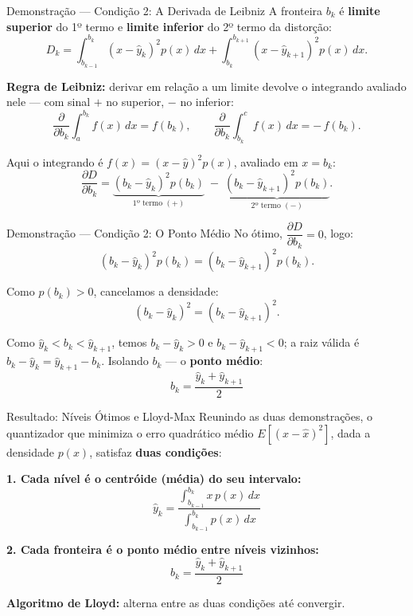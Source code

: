 
\begin{frame}{Demonstração — Condição 2: A Derivada de Leibniz}
  A fronteira $b_k$ é \textbf{limite superior} do 1º termo e
  \textbf{limite inferior} do 2º termo da distorção:
  \[
    D_k = \int_{b_{k-1}}^{b_k}\!\!\left(x-\hat{y}_k\right)^2 p(x)\,dx
        + \int_{b_k}^{b_{k+1}}\!\!\left(x-\hat{y}_{k+1}\right)^2 p(x)\,dx.
  \]

  \textbf{Regra de Leibniz:} derivar em relação a um limite devolve o
  integrando avaliado nele — com sinal $+$ no superior, $-$ no inferior:
  \[
    \frac{\partial}{\partial b_k}\!\int_{a}^{b_k}\! f(x)\,dx = f(b_k),
    \qquad
    \frac{\partial}{\partial b_k}\!\int_{b_k}^{c}\! f(x)\,dx = -\,f(b_k).
  \]

  Aqui o integrando é $f(x) = (x-\hat{y})^2 p(x)$, avaliado em $x=b_k$:
  \[
    \frac{\partial D}{\partial b_k}
    = \underbrace{\left(b_k-\hat{y}_k\right)^2 p(b_k)}_{\text{1º termo }(+)}
    \;-\;
    \underbrace{\left(b_k-\hat{y}_{k+1}\right)^2 p(b_k)}_{\text{2º termo }(-)}.
  \]
\end{frame}


\begin{frame}{Demonstração — Condição 2: O Ponto Médio}
  No ótimo, $\dfrac{\partial D}{\partial b_k} = 0$, logo:
  \[
    \left(b_k-\hat{y}_k\right)^2 p(b_k)
    = \left(b_k-\hat{y}_{k+1}\right)^2 p(b_k).
  \]

  Como $p(b_k) > 0$, cancelamos a densidade:
  \[
    \left(b_k-\hat{y}_k\right)^2 = \left(b_k-\hat{y}_{k+1}\right)^2.
  \]

  Como $\hat{y}_k < b_k < \hat{y}_{k+1}$, temos $b_k-\hat{y}_k > 0$ e
  $b_k-\hat{y}_{k+1} < 0$; a raiz válida é
  $b_k-\hat{y}_k = \hat{y}_{k+1}-b_k$. Isolando $b_k$ — o
  \textbf{ponto médio}:
  \[
    \boxed{\;b_k = \frac{\hat{y}_k + \hat{y}_{k+1}}{2}\;}
  \]
\end{frame}


\begin{frame}{Resultado: Níveis Ótimos e Lloyd-Max}
  Reunindo as duas demonstrações, o quantizador que minimiza o erro
  quadrático médio $E\!\left[(x-\hat{x})^2\right]$, dada a densidade
  $p(x)$, satisfaz \textbf{duas condições}:

  \vspace{0.15cm}
  \textbf{1. Cada nível é o centróide (média) do seu intervalo:}
  \[
    \hat{y}_k = \frac{\displaystyle\int_{b_{k-1}}^{b_k} x\,p(x)\,dx}
                     {\displaystyle\int_{b_{k-1}}^{b_k} p(x)\,dx}
  \]

  \textbf{2. Cada fronteira é o ponto médio entre níveis vizinhos:}
  \[
    b_k = \frac{\hat{y}_k + \hat{y}_{k+1}}{2}
  \]

  \vspace{-0.05cm}
  {\footnotesize \textbf{Algoritmo de Lloyd:} alterna entre as duas
  condições até convergir.}
\end{frame}

